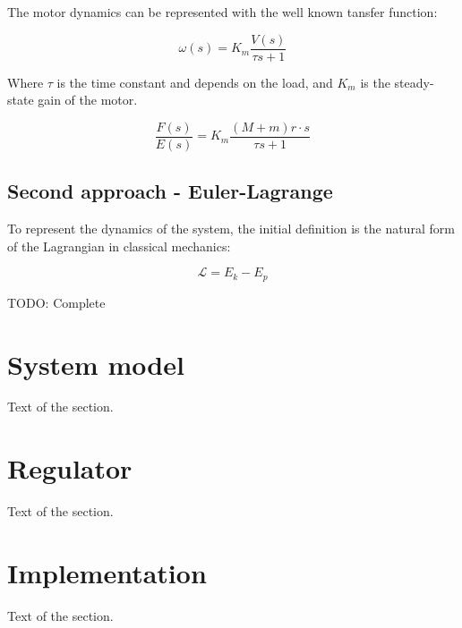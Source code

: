 \documentclass{article}
\begin{document}
The motor dynamics can be represented with the well known tansfer function:

\begin{equation} \label{md}
\omega(s)=K_m\frac{V(s)}{\tau s+1}
\end{equation}

Where $\tau$ is the time constant and depends on the load, and $K_m$ is the steady-state gain of the motor.

\begin{equation} \label{mtf}
\frac{F(s)}{E(s)}=K_m\frac{(M+m)r\cdot s}{\tau s+1}
\end{equation}

\subsection{Second approach - Euler-Lagrange}

To represent the dynamics of the system, the initial definition is the natural form of the Lagrangian in classical mechanics:

\begin{equation} \label{mtf}
\mathcal{L}=E_k-E_p
\end{equation}

TODO: Complete

\section{System model}

Text of the section.

\section{Regulator}

Text of the section.

\section{Implementation}

Text of the section.

\begin{appendix}
	\newpage
	\listoffigures
	\newpage
	\listoftables
\end{appendix}

\newpage
\printbibliography
\nocite{*}
\end{document}
